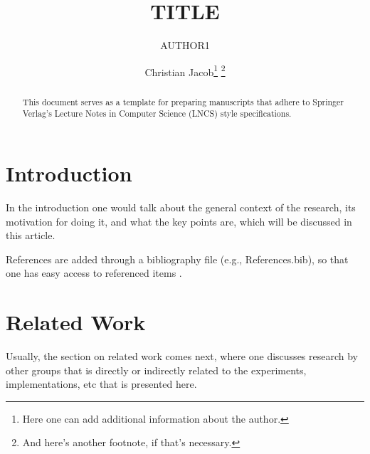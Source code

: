\documentclass[runningheads]{llncs}
\begin{document}
\title{TITLE}

\author{AUTHOR1  \and Christian Jacob\thanks{Here one can add additional information about the author.} \fnmsep \thanks{And here's another footnote, if that's necessary.}}


\maketitle


\begin{abstract} 
This document serves as a template for preparing manuscripts that adhere to Springer Verlag's Lecture Notes in Computer Science (LNCS) style specifications.
\end{abstract}


\section{Introduction}
\label{sec:Introduction}
In the introduction one would talk about the general context of the research, its motivation for doing it, and what the key points are, which will be discussed in this article. 

References are added through a bibliography file (e.g., References.bib), so that one has easy access to referenced items \cite{Alon:1999aa}.

\section{Related Work}
Usually, the section on related work comes next, where one discusses research by other groups that is directly or indirectly related to the experiments, implementations, etc that is presented here.
\end{document}
